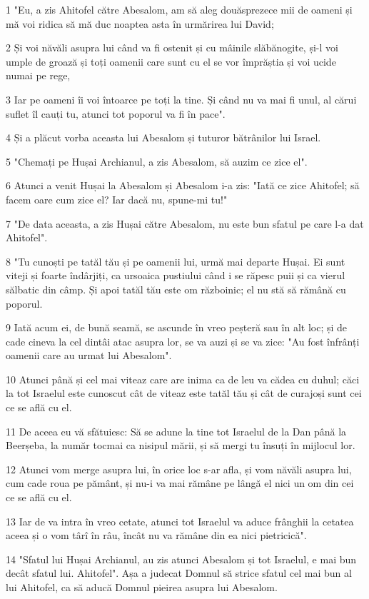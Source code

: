 \par 1 "Eu, a zis Ahitofel către Abesalom, am să aleg douăsprezece mii de oameni și mă voi ridica să mă duc noaptea asta în urmărirea lui David;
\par 2 Și voi năvăli asupra lui când va fi ostenit și cu mâinile slăbănogite, și-l voi umple de groază și toți oamenii care sunt cu el se vor împrăștia și voi ucide numai pe rege,
\par 3 Iar pe oameni îi voi întoarce pe toți la tine. Și când nu va mai fi unul, al cărui suflet îl cauți tu, atunci tot poporul va fi în pace".
\par 4 Și a plăcut vorba aceasta lui Abesalom și tuturor bătrânilor lui Israel.
\par 5 "Chemați pe Hușai Archianul, a zis Abesalom, să auzim ce zice el".
\par 6 Atunci a venit Hușai la Abesalom și Abesalom i-a zis: "Iată ce zice Ahitofel; să facem oare cum zice el? Iar dacă nu, spune-mi tu!"
\par 7 "De data aceasta, a zis Hușai către Abesalom, nu este bun sfatul pe care l-a dat Ahitofel".
\par 8 "Tu cunoști pe tatăl tău și pe oamenii lui, urmă mai departe Hușai. Ei sunt viteji și foarte îndârjiți, ca ursoaica pustiului când i se răpesc puii și ca vierul sălbatic din câmp. Și apoi tatăl tău este om războinic; el nu stă să rămână cu poporul.
\par 9 Iată acum ei, de bună seamă, se ascunde în vreo peșteră sau în alt loc; și de cade cineva la cel dintâi atac asupra lor, se va auzi și se va zice: "Au fost înfrânți oamenii care au urmat lui Abesalom".
\par 10 Atunci până și cel mai viteaz care are inima ca de leu va cădea cu duhul; căci la tot Israelul este cunoscut cât de viteaz este tatăl tău și cât de curajoși sunt cei ce se află cu el.
\par 11 De aceea eu vă sfătuiesc: Să se adune la tine tot Israelul de la Dan până la Beerșeba, la număr tocmai ca nisipul mării, și să mergi tu însuți în mijlocul lor.
\par 12 Atunci vom merge asupra lui, în orice loc s-ar afla, și vom năvăli asupra lui, cum cade roua pe pământ, și nu-i va mai rămâne pe lângă el nici un om din cei ce se află cu el.
\par 13 Iar de va intra în vreo cetate, atunci tot Israelul va aduce frânghii la cetatea aceea și o vom târî în râu, încât nu va rămâne din ea nici pietricică".
\par 14 "Sfatul lui Hușai Archianul, au zis atunci Abesalom și tot Israelul, e mai bun decât sfatul lui. Ahitofel". Așa a judecat Domnul să strice sfatul cel mai bun al lui Ahitofel, ca să aducă Domnul pieirea asupra lui Abesalom.
